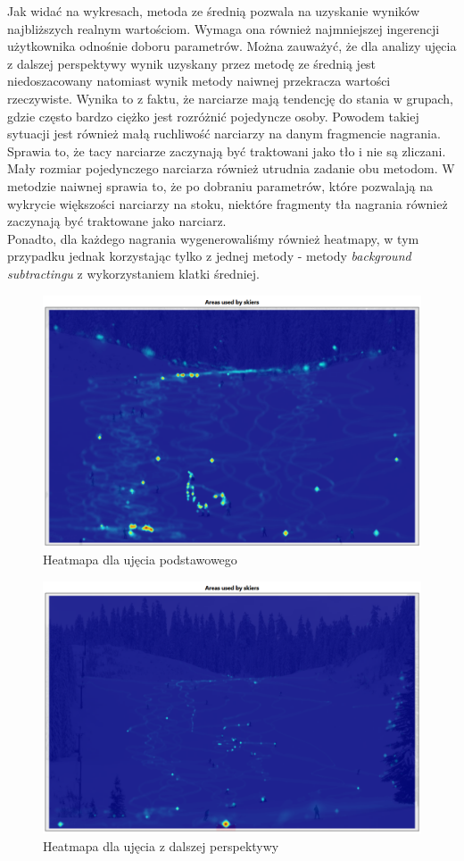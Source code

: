 \documentclass[a4paper]{article}
\begin{document}
Jak widać na wykresach, metoda ze średnią pozwala na uzyskanie wyników najbliższych realnym wartościom. Wymaga ona również najmniejszej ingerencji użytkownika odnośnie doboru parametrów. Można zauważyć, że dla analizy ujęcia z dalszej perspektywy wynik uzyskany przez metodę ze średnią jest niedoszacowany natomiast wynik metody naiwnej przekracza wartości rzeczywiste. Wynika to z faktu, że narciarze mają tendencję do stania w grupach, gdzie często bardzo ciężko jest rozróżnić pojedyncze osoby. Powodem takiej sytuacji jest również małą ruchliwość narciarzy na danym fragmencie nagrania. Sprawia to, że tacy narciarze zaczynają być traktowani jako tło i nie są zliczani. Mały rozmiar pojedynczego narciarza również utrudnia zadanie obu metodom. W metodzie naiwnej sprawia to, że po dobraniu parametrów, które pozwalają na wykrycie większości narciarzy na stoku, niektóre fragmenty tła nagrania również zaczynają być traktowane jako narciarz.\\
Ponadto, dla każdego nagrania wygenerowaliśmy również heatmapy, w tym przypadku jednak korzystając tylko z jednej metody - metody \textit{background subtractingu} z wykorzystaniem klatki średniej.
\begin{figure}[H]
  \includegraphics[width=\linewidth]{resources/img11.png}
  \caption{Heatmapa dla ujęcia podstawowego}
\end{figure}
\begin{figure}[H]
  \includegraphics[width=\linewidth]{resources/img12.png}
  \caption{Heatmapa dla ujęcia z dalszej perspektywy}
\end{figure}
\end{document}
